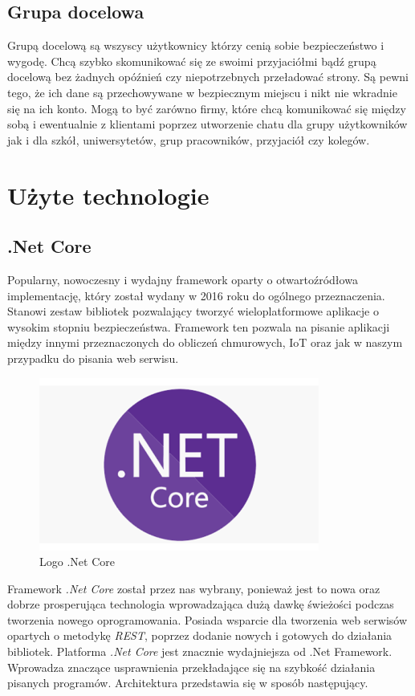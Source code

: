 \documentclass[12pt,a4paper]{article}
\begin{document}
\subsection{Grupa docelowa}
\hspace*{0.7cm} Grupą docelową są wszyscy użytkownicy którzy cenią sobie bezpieczeństwo i wygodę. Chcą szybko skomunikować się ze swoimi przyjaciółmi bądź grupą docelową
bez żadnych opóźnień czy niepotrzebnych przeładować strony. Są pewni tego, że ich dane są przechowywane w bezpiecznym miejscu i nikt nie wkradnie się na ich
konto. Mogą to być zarówno firmy, które chcą komunikować się między sobą i ewentualnie z klientami poprzez utworzenie chatu dla grupy użytkowników jak i dla szkół, uniwersytetów, grup pracowników, przyjaciół czy kolegów. 


\section{Użyte technologie}

\subsection{.Net Core} 			%
\hspace*{0.7cm} Popularny, nowoczesny i wydajny framework oparty o otwartoźródłowa implementację, który został wydany w 2016 roku do ogólnego przeznaczenia. Stanowi zestaw bibliotek pozwalający tworzyć wieloplatformowe aplikacje o wysokim stopniu bezpieczeństwa. Framework ten pozwala na pisanie aplikacji między innymi przeznaczonych do obliczeń chmurowych, IoT oraz jak w naszym przypadku do pisania web serwisu. 

\begin{figure}[H]
	\centering
	\includegraphics[width=0.3\linewidth]{dotnet5_platform}
	\caption{Logo .Net Core}
	\label{fig:dotnet5platform}
\end{figure}

Framework \textit{.Net Core} został przez nas wybrany, ponieważ jest to nowa oraz dobrze prosperująca technologia wprowadzająca dużą dawkę świeżości podczas tworzenia nowego oprogramowania. Posiada wsparcie dla tworzenia web serwisów opartych o metodykę \textit{REST}, poprzez dodanie nowych i gotowych do działania bibliotek. Platforma \textit{.Net Core} jest znacznie wydajniejsza od .Net Framework. Wprowadza znaczące usprawnienia przekładające się na szybkość działania pisanych programów. Architektura przedstawia się w sposób następujący.\newline
\end{document}
